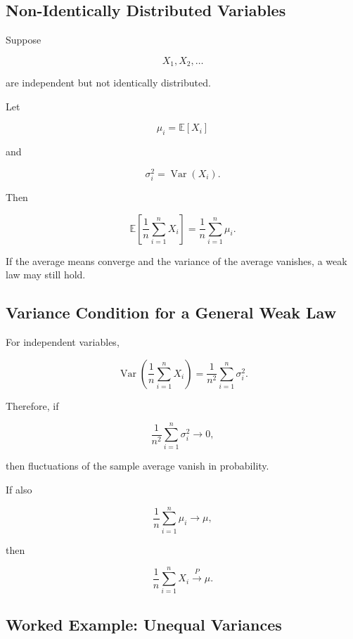 \subsection{Non-Identically Distributed Variables}
\label{subsec:non-identically-distributed-lln}

Suppose

\[
X_1,X_2,\ldots
\]

are independent but not identically distributed.

Let

\[
\mu_i
=
\mathbb{E}[X_i]
\]

and

\[
\sigma_i^2
=
\operatorname{Var}(X_i).
\]

Then

\[
\mathbb{E}
\left[
\frac1n
\sum_{i=1}^{n}X_i
\right]
=
\frac1n
\sum_{i=1}^{n}\mu_i.
\]

If the average means converge and the variance of the average vanishes,
a weak law may still hold.

\subsection{Variance Condition for a General Weak Law}
\label{subsec:variance-condition-general-wlln}

For independent variables,

\[
\operatorname{Var}
\left(
\frac1n
\sum_{i=1}^{n}X_i
\right)
=
\frac1{n^2}
\sum_{i=1}^{n}\sigma_i^2.
\]

Therefore, if

\[
\boxed{
\frac1{n^2}
\sum_{i=1}^{n}\sigma_i^2
\to0,
}
\]

then fluctuations of the sample average vanish in probability.

If also

\[
\frac1n
\sum_{i=1}^{n}\mu_i
\to\mu,
\]

then

\[
\boxed{
\frac1n
\sum_{i=1}^{n}X_i
\xrightarrow{P}
\mu.
}
\]

\subsection{Worked Example: Unequal Variances}
\label{subsec:worked-unequal-variances-wlln}

